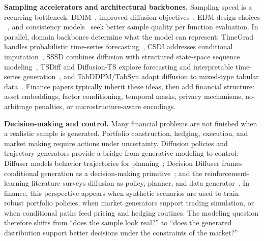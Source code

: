 \documentclass[sigconf,nonacm]{acmart}
\begin{document}
\textbf{Sampling accelerators and architectural backbones.}
Sampling speed is a recurring bottleneck. DDIM~\cite{songddim2021}, improved
diffusion objectives~\cite{nichol2021improved}, EDM design choices
~\cite{karras2022edm}, and consistency models~\cite{song2023consistency} seek
better sample quality per function evaluation. In parallel, domain backbones
determine what the model can represent:
TimeGrad handles probabilistic time-series forecasting~\cite{rasul2021timegrad},
CSDI addresses conditional imputation~\cite{tashiro2021csdi}, SSSD combines
diffusion with structured state-space sequence modeling~\cite{alcaraz2022sssd},
TSDiff and Diffusion-TS explore forecasting and interpretable time-series
generation~\cite{kollovieh2023tsdiff,yuan2024diffusionts}, and TabDDPM/TabSyn
adapt diffusion to mixed-type tabular data~\cite{kotelnikov2023tabddpm,
zhang2024tabsyn}. Finance papers typically inherit these ideas, then add
financial structure: asset embeddings, factor conditioning, temporal masks,
privacy mechanisms, no-arbitrage penalties, or microstructure-aware encodings.

\textbf{Decision-making and control.}
Many financial problems are not finished when a realistic sample is generated.
Portfolio construction, hedging, execution, and market making require actions
under uncertainty. Diffusion policies and trajectory generators provide a bridge
from generative modeling to control: Diffuser models behavior trajectories for
planning~\cite{janner2022diffuser}; Decision Diffuser frames conditional
generation as a decision-making primitive~\cite{ajay2022decisiondiffuser}; and
the reinforcement-learning literature surveys diffusion as policy, planner, and
data generator~\cite{zhu2023diff4rl}. In finance, this perspective appears when
synthetic scenarios are used to train robust portfolio policies, when market
generators support trading simulation, or when conditional paths feed pricing and
hedging routines. The modeling question therefore shifts from ``does the sample
look real?'' to ``does the generated distribution support better decisions under
the constraints of the market?''
\end{document}
